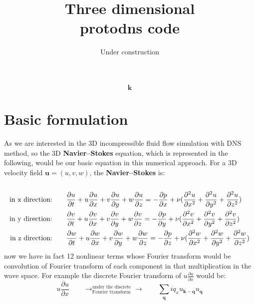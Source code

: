 \documentclass[10pt]{article}
\title{\huge{\textbf{Three dimensional  \\ \vspace{1cm} protodns code}}}
\author{Under construction}
\date{}
\def\k{\bm{k}}
\def\q{\bm{q}}
\def\u{\bm{u}}
\begin{document}
\maketitle

\begin{equation}
\k
\end{equation}

\section{Basic formulation}
As we are interested in the 3D incompressible fluid flow simulation with DNS method, so the 3D \textbf{Navier--Stokes} equation, which is represented in the following, would be our basic equation in this numerical approach. For a 3D velocity field $\u=(u,v,w)$, the \textbf{Navier--Stokes} is:\\
\\
%
\begin{align}
\text{in x direction:}\qquad &\frac{\partial u}{\partial t} + u\frac{\partial u}{\partial x} + v\frac{\partial u}{\partial y} + w\frac{\partial u}{\partial z} = - \frac{\partial p}{\partial x} + \nu(\frac{\partial^2 u}{\partial x^2}+\frac{\partial^2 u}{\partial y^2}+\frac{\partial^2 u}{\partial z^2})        \notag 
\\
\text{in y direction:}\qquad &\frac{\partial v}{\partial t} + u\frac{\partial v}{\partial x} + v\frac{\partial v}{\partial y} + w\frac{\partial v}{\partial z} = - \frac{\partial p}{\partial y} + \nu(\frac{\partial^2 v}{\partial x^2}+\frac{\partial^2 v}{\partial y^2}+\frac{\partial^2 v}{\partial z^2}) 		         
\\
\text{in z direction:}\qquad &\frac{\partial w}{\partial t} + u\frac{\partial w}{\partial x} + v\frac{\partial w}{\partial y} + w\frac{\partial w}{\partial z} = - \frac{\partial p}{\partial z} + \nu(\frac{\partial^2 w}{\partial x^2}+\frac{\partial^2 w}{\partial y^2}+\frac{\partial^2 w}{\partial z^2})         \notag
\end{align}
%
now we have in fact 12 nonlinear terms whose Fourier transform would be convolution of Fourier transform of each component in that multiplication in the wave space. For example the discrete Fourier transform of $u\frac{\partial u}{\partial x}$ would be:
%
\begin{equation}
u\frac{\partial u}{\partial x} \qquad\rightarrow^{\text{under the discrete}}_{\text{Fourier transform}}\rightarrow\qquad \sum_{\q}{iq_{x}u_{\k - \q}u_{\q}}
\end{equation}
\end{document}

